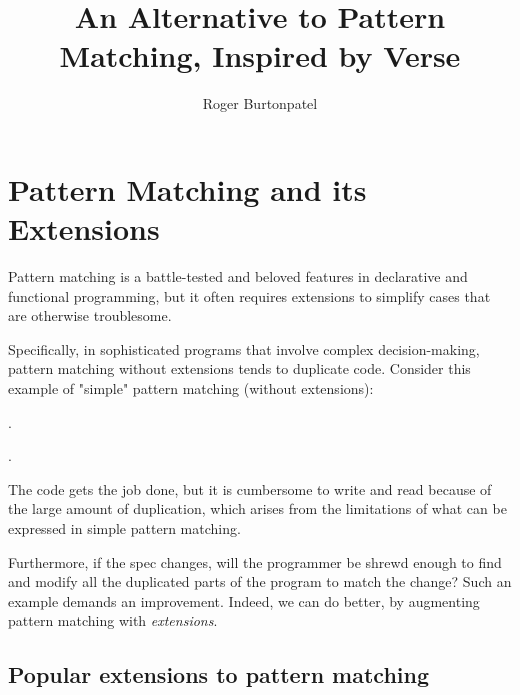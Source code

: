 \documentclass[manuscript,screen 12pt, nonacm]{acmart}
\title{An Alternative to Pattern Matching, Inspired by Verse}
\author{Roger Burtonpatel}
\affiliation{%
  \institution{Tufts University}
  \streetaddress{419 Boston Ave}
  \city{Medford}
  \state{Massachusetts}
  \country{USA}
  \postcode{02155}
}
\begin{document}
\section{Pattern Matching and its Extensions}
\label{pmandextensions}
    \textbf{}


    Pattern matching is a battle-tested and beloved features in declarative and
    functional programming, but it often requires extensions to simplify cases
    that are otherwise troublesome. 
    
    
    Specifically, in sophisticated programs that involve complex
    decision-making, pattern matching without extensions tends to duplicate
    code. Consider this example of "simple" pattern matching (without
    extensions): 

    .

    . 

    The code gets the job done, but it is cumbersome to write and read because
    of the large amount of duplication, which arises from the limitations of
    what can be expressed in simple pattern matching. 
    
    Furthermore, if the spec changes, will the programmer be shrewd enough to
    find and modify all the duplicated parts of the program to match the change?
    Such an example demands an improvement. Indeed, we can do better, by 
    augmenting pattern matching with \textit{extensions}. 


    \subsection{Popular extensions to pattern matching}
    \label{extensions}

    
\end{document}
